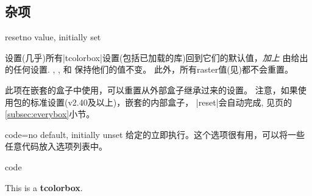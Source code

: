 \subsection{杂项}
\begin{docTcbKey}{reset}{}{no value, initially set}

设置(几乎)所有|tcolorbox|设置(包括已加载的库)回到它们的默认值，\emph{加上} 由给出的任何设置.%
, , 和  保持他们的值不变。%
此外，所有raster值(见)都不会重置。

此项在嵌套的盒子中使用，可以重置从外部盒子继承过来的设置。%
注意，如果使用包的标准设置(v2.40及以上)，嵌套的内部盒子， |reset|会自动完成, 见\pageref{subsec:everybox}页的\ref{subsec:everybox}小节。
\end{docTcbKey}




\begin{docTcbKey}{code}{=}{no default, initially unset}
给定的立即执行。这个选项很有用，可以将一些任意代码放入选项列表中。
\begin{exdispExample}{code}

\begin{tcolorbox}[code={\newcommand{\mycommand}{\textit{working}}},
  title=My \mycommand\ title]
This is a \textbf{tcolorbox}.
\end{tcolorbox}
\end{exdispExample}
\end{docTcbKey}



